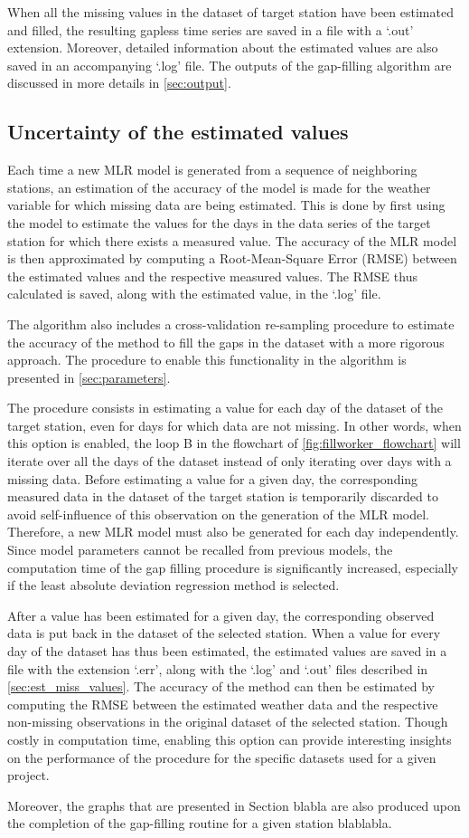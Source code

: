 \documentclass[TechnicalNoteMeteo.tex]{subfiles}
\begin{document}
When all the missing values in the dataset of target station have been estimated and filled, the resulting gapless time series are saved in a file with a `.out' extension. Moreover, detailed information about the estimated values are also saved in an accompanying `.log' file. The outputs of the gap-filling algorithm are discussed in more details in \cref{sec:output}.

\subsection{Uncertainty of the estimated values}

Each time a new MLR model is generated from a sequence of neighboring stations, an estimation of the accuracy of the model is made for the weather variable for which missing data are being estimated. This is done by first using the model to estimate the values for the days in the data series of the target station for which there exists a measured value. The accuracy of the MLR model is then approximated by computing a Root-Mean-Square Error (RMSE) between the estimated values and the respective measured values. The RMSE thus calculated is saved, along with the estimated value, in the `.log' file.

The algorithm also includes a cross-validation re-sampling procedure to estimate the accuracy of the method to fill the gaps in the dataset with a more rigorous approach. The procedure to enable this functionality in the algorithm is presented in \cref{sec:parameters}.

The procedure consists in estimating a value for each day of the dataset of the target station, even for days for which data are not missing. In other words, when this option is enabled, the loop B in the flowchart of \cref{fig:fillworker_flowchart} will iterate over all the days of the dataset instead of only iterating over days with a missing data. Before estimating a value for a given day, the corresponding measured data in the dataset of the target station is temporarily discarded to avoid self-influence of this observation on the generation of the MLR model. Therefore, a new MLR model must also be generated for each day independently. Since model parameters cannot be recalled from previous models, the computation time of the gap filling procedure is significantly increased, especially if the least absolute deviation regression method is selected.

After a value has been estimated for a given day, the corresponding observed data is put back in the dataset of the selected station. When a value for every day of the dataset has thus been estimated, the estimated values are saved in a file with the extension `.err', along with the `.log' and `.out' files described in \cref{sec:est_miss_values}. The accuracy of the method can then be estimated by computing the RMSE between the estimated weather data and the respective non-missing observations in the original dataset of the selected station. Though costly in computation time, enabling this option can provide interesting insights on the performance of the procedure for the specific datasets used for a given project.

Moreover, the graphs that are presented in Section blabla are also produced upon the completion of the gap-filling routine for a given station blablabla.
\end{document}
